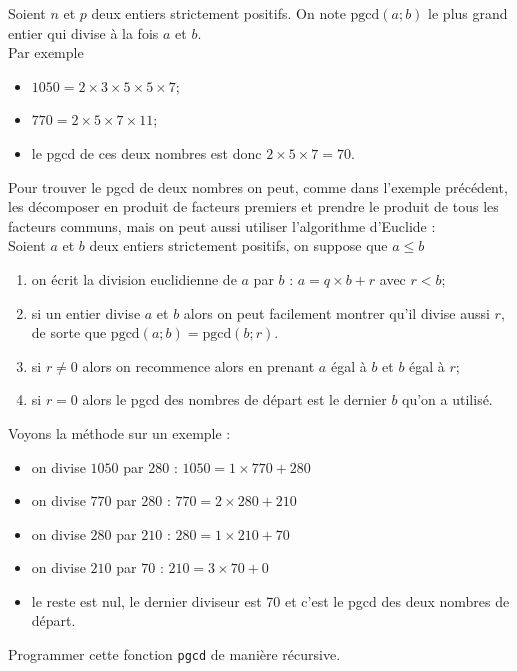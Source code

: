 \documentclass[10pt,firamath,cours]{nsi}
\begin{document}
\begin{exercice}
	Soient $n$ et $p$ deux entiers strictement positifs. On note $\mbox{pgcd}(a;b)$ le plus grand entier qui divise à la fois $a$ et $b$.\\
	Par exemple
	\begin{itemize}
		\item 	$1050 = 2\times 3\times	5\times 5\times 7$;
		\item 	$770=2\times 5\times 7\times 11$;
		\item 	le pgcd de ces deux nombres est donc $2\times 5\times 7 =70$.
	\end{itemize}
	Pour trouver le pgcd de deux nombres on peut, comme dans l'exemple précédent, les décomposer en produit de facteurs premiers et prendre le produit de tous les facteurs communs, mais on peut aussi utiliser l'algorithme d'Euclide :\\
	Soient $a$ et $b$ deux entiers strictement positifs, on suppose que $a\leqslant b$
	\begin{enumerate}
		\item on écrit la division euclidienne de $a$ par $b$ : $a=q\times b + r$ avec $r<b$;
		\item si un entier divise $a$ et $b$ alors on peut facilement montrer qu'il divise aussi $r$, de sorte que $\mbox{pgcd}(a;b)=\mbox{pgcd}(b;r)$.
		\item si $r\neq 0$ alors on recommence alors en prenant $a$ égal à $b$ et $b$ égal à $r$;
		\item si $r=0$ alors le pgcd des nombres de départ est le dernier $b$ qu'on a utilisé.
	\end{enumerate}
	Voyons la méthode sur un exemple :
	\begin{itemize}
		\item 	on divise $1050$ par $280$ : $1050 = 1\times 770 + 280$
		\item 	on divise $770$ par $280$ : $770 = 2\times 280 + 210$
		\item 	on divise $280$ par $210$ : $280 = 1\times 210 + 70$
		\item 	on divise $210$ par $70$ : $210 = 3\times 70 + 0$
		\item 	le reste est nul, le dernier diviseur est 70 et c'est le pgcd des deux nombres de départ.
	\end{itemize}
	Programmer cette fonction \texttt{pgcd} de manière récursive.
\end{exercice}
\end{document}
